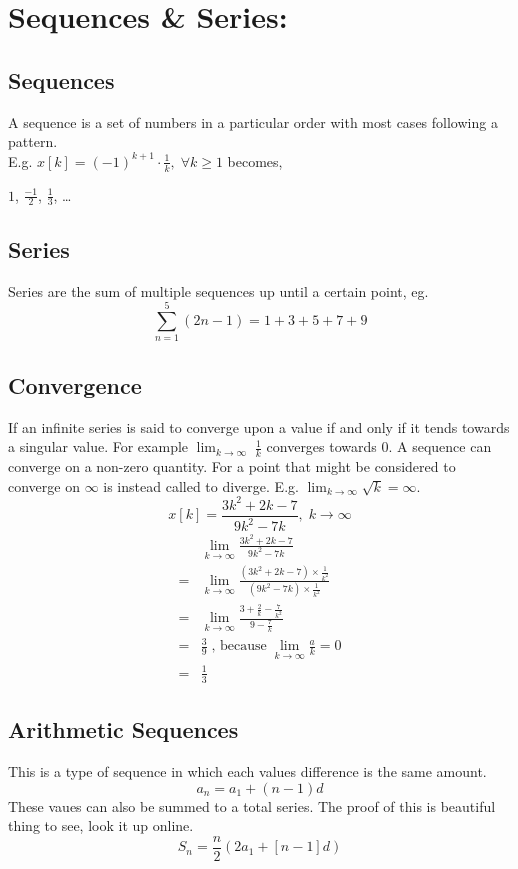 \documentclass[a5paper]{article}
\begin{document}
	\section{Sequences \& Series:}
	\subsection{Sequences}
	A sequence is a set of numbers in a particular order with most cases following a pattern.\\
	E.g. $x[k]=(-1)^{k+1}\cdot\frac{1}{k},\;\forall k\geq 1$ becomes,\par
	$1$, $\frac{-1}{2}$, $\frac{1}{3}$, \ldots

	\subsection{Series}
	Series are the sum of multiple sequences up until  a certain point, eg.
	$$\sum^{5}_{n=1}(2n-1)=1+3+5+7+9$$

	\subsection{Convergence}
	If an infinite series is said to converge upon a value if and only if it tends towards a singular value. For example $\lim_{k\to\infty}\;\frac{1}{k}$ converges towards 0. A sequence can converge on a non-zero quantity. For a point that might be considered to converge on $\infty$ is instead called to diverge. E.g. $\lim_{k\to\infty}\sqrt{k}=\infty$.
	$$x[k]=\frac{3k^{2}+2k-7}{9k^{2}-7k},\;k\to\infty$$
	\begin{align*}
		&\lim_{k\to\infty}\frac{3k^{2}+2k-7}{9k^{2}-7k}\\
		=&\lim_{k\to\infty}\frac{(3k^{2}+2k-7)\times\frac{1}{k^{2}}}{(9k^{2}-7k)\times\frac{1}{k^{2}}}\\
		=&\lim_{k\to\infty}\frac{3+\frac{2}{k}-\frac{7}{k^{2}}}{9-\frac{7}{k}}\\
		=&\frac{3}{9}\;\text{, because}\;\lim_{k\to\infty}\frac{a}{k}=0\\
		=&\frac{1}{3}
	\end{align*}

	\subsection{Arithmetic Sequences}
	This is a type of sequence in which each values difference is the same amount.
	$$a_{n}=a_{1}+(n-1)d$$
	These vaues can also be summed to a total series. The proof of this is beautiful thing to see, look it up online.
	$$S_{n}=\frac{n}{2}(2a_{1}+[n-1]d)$$
\end{document}
